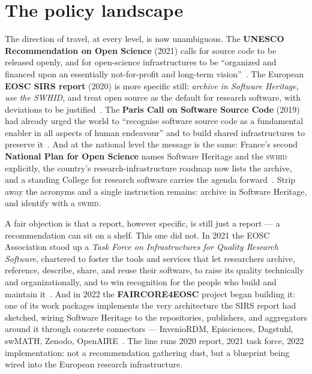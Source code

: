 \section{The policy landscape}\label{sec:policy-backs}

The direction of travel, at every level, is now unambiguous. The \textbf{UNESCO Recommendation on
Open Science} (2021) calls for source code to be released openly, and for open-science
infrastructures to be \enquote{organized and financed upon an essentially not-for-profit and
long-term vision}~\autocite{UNESCO2021OpenScience}. The European \textbf{EOSC SIRS report} (2020) is
more specific still: \emph{archive in Software Heritage, use the SWHID}, and treat open source as the
default for research software, with deviations to be justified~\autocite{SIRSReport2020}. The
\textbf{Paris Call on Software Source Code} (2019) had already urged the world to \enquote{recognise
software source code as a fundamental enabler in all aspects of human endeavour} and to build shared
infrastructures to preserve it~\autocite{ParisCall2019}. And at the national level the message is the
same: France's second \textbf{National Plan for Open Science} names Software Heritage and the
\textsc{swhid} explicitly, the country's research-infrastructure roadmap now lists the archive, and a
standing College for research software carries the agenda forward~\autocite{PNSO2_2021,osec_2022}.
Strip away the acronyms and a single instruction remains: archive in Software Heritage, and identify
with a \textsc{swhid}.

A fair objection is that a report, however specific, is still just a report --- a recommendation can
sit on a shelf. This one did not. In 2021 the EOSC Association stood up a \emph{Task Force on
Infrastructures for Quality Research Software}, chartered to foster the tools and services that let
researchers archive, reference, describe, share, and reuse their software, to raise its quality
technically and organizationally, and to win recognition for the people who build and maintain
it~\autocite{EOSC_TaskForce2021}. And in 2022 the \textbf{FAIRCORE4EOSC} project began building it:
one of its work packages implements the very architecture the SIRS report had sketched, wiring
Software Heritage to the repositories, publishers, and aggregators around it through concrete
connectors --- InvenioRDM, Episciences, Dagstuhl, swMATH, Zenodo, OpenAIRE~\autocite{FAIRCORE4EOSC2022}.
The line runs 2020 report, 2021 task force, 2022 implementation: not a recommendation gathering dust,
but a blueprint being wired into the European research infrastructure.

